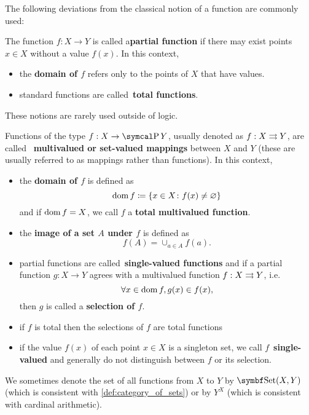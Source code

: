 \begin{definition}
  The following deviations from the classical notion of a function are commonly used:
  \begin{itemize}
     The function \( f: X \to Y \) is called a\textbf{partial function} if there may exist points \( x \in X \) without a value \( f(x) \). In this context,
    \begin{itemize}
      \item the \textbf{domain of \( f \)} refers only to the points of \( X \) that have values.
      \item standard functions are called~\textbf{total functions}.
    \end{itemize}

    These notions are rarely used outside of logic.

     Functions of the type \( f: X \to \Power Y \), usually denoted as \( f: X \rightrightarrows Y \), are called ~\textbf{multivalued or set-valued mappings} between \( X \) and \( Y \) (these are usually referred to as mappings rather than functions). In this context,
    \begin{itemize}
      \item the \textbf{domain of \( f \)} is defined as
      \begin{equation*}
        \operatorname{dom} f \coloneqq \{ x \in X \colon f(x) \neq \varnothing \}
      \end{equation*}
      and if \( \operatorname{dom} f = X \), we call \( f \) a \textbf{total multivalued function}.

      \item the \textbf{image of a set \( A \) under \( f \)} is defined as
      \begin{equation*}
        f(A) = \cup_{a \in A} f(a).
      \end{equation*}

      \item partial functions are called~\textbf{single-valued functions} and if a partial function \( g: X \to Y \) agrees with a multivalued function \( f: X \rightrightarrows Y \), i.e.
      \begin{equation*}
        \forall x \in \operatorname{dom} f, g(x) \in f(x),
      \end{equation*}
      then \( g \) is called a \textbf{selection of \( f \)}.

      \item if \( f \) is total then the selections of \( f \) are total functions

      \item if the value \( f(x) \) of each point \( x \in X \) is a singleton set, we call \( f \)~\textbf{single-valued} and generally do not distinguish between \( f \) or its selection.
    \end{itemize}
  \end{itemize}

  We sometimes denote the set of all functions from \( X \) to \( Y \) by \( \Bold{Set}(X, Y) \) (which is consistent with \cref{def:category_of_sets}) or by \( Y^X \) (which is consistent with cardinal arithmetic).
\end{definition}

